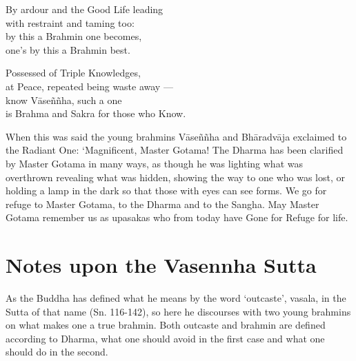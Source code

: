 \begin{MyDescription}{}
By ardour and the Good Life leading\\
with restraint and taming too:\\
by this a Brahmin one becomes,\\
one's by this a Brahmin best.
\end{MyDescription}

\begin{MyDescription}{}
Possessed of Triple Knowledges,\\
at Peace, repeated being waste away —\\
know V\=ase\~n\~nha, such a one\\
is Brahma and Sakra for those who Know.
\end{MyDescription}



When this was said the young brahmins V\=ase\~n\~nha and Bh\=aradv\=aja exclaimed to the Radiant One: `Magnificent, Master Gotama! The Dharma has been clarified by Master Gotama in many ways, as though he was lighting what was overthrown revealing what was hidden, showing the way to one who was lost, or holding a lamp in the dark so that those with eyes can see forms. We go for refuge to Master Gotama, to the Dharma and to the Sangha. May Master Gotama remember us as upasakas who from today have Gone for Refuge for life.
 
\begin{MyDescription}[(Sn. 594-656)]{}

\end{MyDescription} 
\newpage

\section{Notes upon the Vasennha Sutta}
As the Buddha has defined what he means by the word `outcaste', vasala, in the Sutta of that name (Sn. 116-142), so here he discourses with two young brahmins on what makes one a true brahmin. Both outcaste and brahmin are defined according to Dharma, what one should avoid in the first case and what one should do in the second.\\

